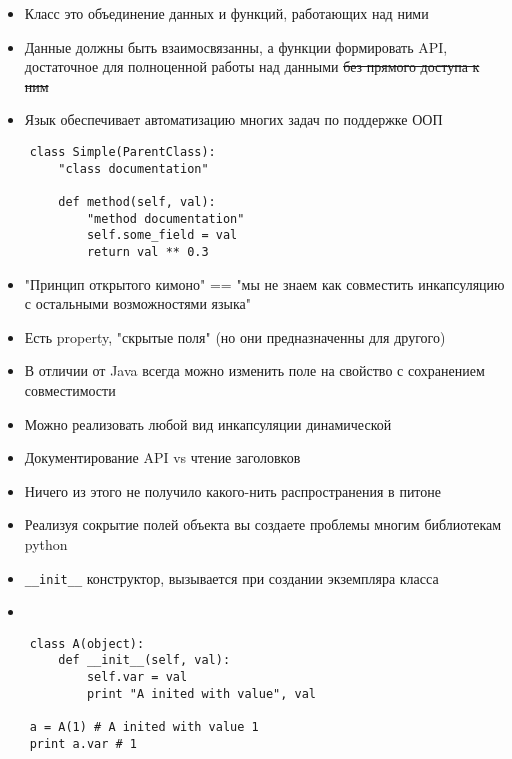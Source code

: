 \documentclass{article}
\begin{document}
\LARGE

\begin{itemize}
	\item Класс это объединение данных и функций, работающих над ними
	\item Данные должны быть взаимосвязанны, а функции формировать API, 
			достаточное для полноценной работы над данными \sout{без прямого 
			доступа к ним}
	\item Язык обеспечивает автоматизацию многих задач по поддержке ООП
\end{itemize}
\newpage

\vspace{15pt}
\begin{lstlisting}
	class Simple(ParentClass):
		"class documentation"

		def method(self, val):
			"method documentation"
			self.some_field = val
			return val ** 0.3
\end{lstlisting}
\newpage

\begin{itemize}
	\item "Принцип открытого кимоно" == 
		"мы не знаем как совместить инкапсуляцию 
		с остальными возможностями языка"
	\item Есть property, "скрытые поля" (но они предназначенны для другого)
	\item В отличии от Java всегда можно изменить поле на свойство 
			с сохранением совместимости
	\item Можно реализовать любой вид инкапсуляции динамической
	\item Документирование API vs чтение заголовков
	\item Ничего из этого не получило какого-нить распространения в питоне
	\item Реализуя сокрытие полей объекта вы 
		создаете проблемы многим библиотекам python
\end{itemize}
\newpage

\begin{itemize}
	\item \lstinline!__init__! конструктор, вызывается 
		при создании экземпляра класса
	\item 
\end{itemize}
\vspace{15pt}
\begin{lstlisting}
	class A(object):
		def __init__(self, val):
			self.var = val
			print "A inited with value", val

	a = A(1) # A inited with value 1
	print a.var # 1
\end{lstlisting}
\newpage
\end{document}
